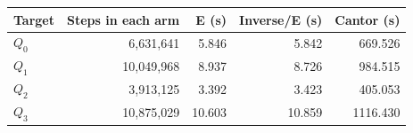 \begin{tabular}{lrrrr}\toprule
Target & Steps in each arm & E (s) & Inverse/E (s) & Cantor (s)\\\midrule
$Q_0$ & 6,631,641 & 5.846 & 5.842 & 669.526 \\
$Q_1$ & 10,049,968 & 8.937 & 8.726 & 984.515 \\
$Q_2$ & 3,913,125 & 3.392 & 3.423 & 405.053 \\
$Q_3$ & 10,875,029 & 10.603 & 10.859 & 1116.430 \\
\bottomrule\end{tabular}
